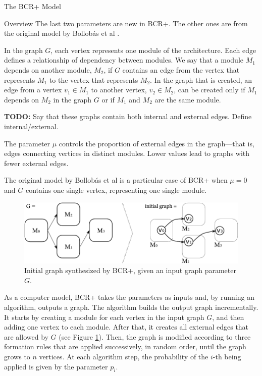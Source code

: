 \documentclass[11pt,twocolumn,a4paper,english]{article}
\newcommand{\TODO}{\textbf{TODO:} }
\begin{document}
\begin{section}{The BCR+ Model}
\begin{subsection}{Overview}
	The last two parameters are new in BCR+. The other ones are from the original model by Bollobás et al \cite{Bollobas2003}.
	
	In the graph $G$, each vertex represents one module of the architecture. Each edge defines a relationship of dependency between modules. We say that a module $M_1$ depends on another module, $M_2$, if $G$ contains an edge from the vertex that represents $M_1$ to the vertex that represents $M_2$. In the graph that is created, an edge from a vertex $v_1 \in M_1$ to another vertex, $v_2 \in M_2$, can be created only if $M_1$ depends on $M_2$ in the graph $G$ or if $M_1$ and $M_2$ are the same module.
	
		\TODO Say that these graphs contain both internal and external edges. Define internal/external.
		
	The parameter $\mu$ controls the proportion of external edges in the graph---that is, edges connecting vertices in distinct modules. Lower values lead to graphs with fewer external edges.
	
	The original model by Bollobás et al \cite{Bollobas2003} is a particular case of BCR+ when $\mu = 0$ and $G$ contains one single vertex, representing one single module.
	

\begin{figure}[htbp]
	\centering
		\includegraphics[scale=1]{figures/bcr-initial-graph}
	\caption{Initial graph synthesized by BCR+, given an input graph parameter $G$.}
	\label{fig:bcr-initial-graph}
\end{figure}
	
	As a computer model, BCR+ takes the parameters as inputs and, by running an algorithm, outputs a graph. The algorithm builds the output graph incrementally. It starts by creating a module for each vertex in the input graph $G$, and then adding one vertex to each module. After that, it creates all external edges that are allowed by $G$ (see Figure \ref{fig:bcr-initial-graph}). Then, the graph is modified according to three formation rules that are applied successively, in random order, until the graph grows to $n$ vertices. At each algorithm step, the probability of the $i$-th being applied is given by the parameter $p_i$.


\end{subsection}
\end{section}
\end{document}
